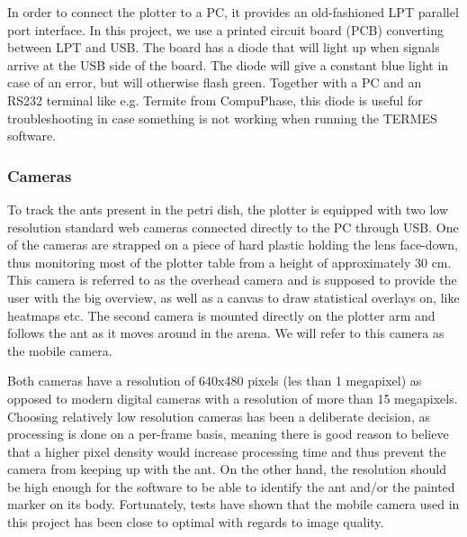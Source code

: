 In order to connect the plotter to a PC, it provides an old-fashioned LPT parallel port interface. In this project, we use a printed circuit board (PCB) converting between LPT and USB. The board has a diode that will light up when signals arrive at the USB side of the board. The diode will give a constant blue light in case of an error, but will otherwise flash green. Together with a PC and an RS232 terminal like e.g. Termite from CompuPhase, this diode is useful for troubleshooting in case something is not working when running the TERMES software. 

%

\subsubsection{Cameras}
To track the ants present in the petri dish, the plotter is equipped with two low resolution standard web cameras connected directly to the PC through USB. One of the cameras are strapped on a piece of hard plastic holding the lens face-down, thus monitoring most of the plotter table from a height of approximately 30 cm. This camera is referred to as the overhead camera and is supposed to provide the user with the big overview, as well as a canvas to draw statistical overlays on, like heatmaps etc. The second camera is mounted directly on the plotter arm and follows the ant as it moves around in the arena. We will refer to this camera as the mobile camera.

Both cameras have a resolution of 640x480 pixels (les than 1 megapixel) as opposed to modern digital cameras with a resolution of more than 15 megapixels. Choosing relatively low resolution cameras has been a deliberate decision, as processing is done on a per-frame basis, meaning there is good reason to believe that a higher pixel density would increase processing time and thus prevent the camera from keeping up with the ant. On the other hand, the resolution should be high enough for the software to be able to identify the ant and/or the painted marker on its body. Fortunately, tests have shown that the mobile camera used in this project has been close to optimal with regards to image quality.

